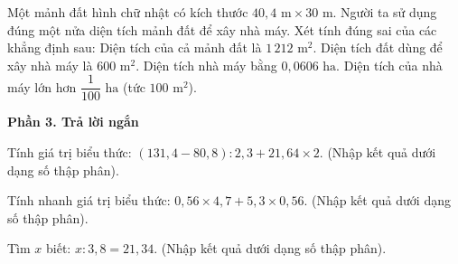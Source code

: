 \begin{ex} %
Một mảnh đất hình chữ nhật có kích thước $40{,}4\text{ m} \times 30\text{ m}$. Người ta sử dụng đúng một nửa diện tích mảnh đất để xây nhà máy. Xét tính đúng sai của các khẳng định sau:
\choiceTF
{\True Diện tích của cả mảnh đất là $1\,212\text{ m}^2$.}
{Diện tích đất dùng để xây nhà máy là $600\text{ m}^2$.}
{\True Diện tích nhà máy bằng $0{,}0606\text{ ha}$.}
{\True Diện tích của nhà máy lớn hơn $\dfrac{1}{100}\text{ ha}$ (tức $100\text{ m}^2$).}
\end{ex}

\textbf{Phần 3. Trả lời ngắn}

\begin{ex} %
Tính giá trị biểu thức: $(131{,}4 - 80{,}8) : 2{,}3 + 21{,}64 \times 2$. (Nhập kết quả dưới dạng số thập phân).
\end{ex}

\begin{ex} %
Tính nhanh giá trị biểu thức: $0{,}56 \times 4{,}7 + 5{,}3 \times 0{,}56$. (Nhập kết quả dưới dạng số thập phân).
\end{ex}

\begin{ex} %
Tìm $x$ biết: $x : 3{,}8 = 21{,}34$. (Nhập kết quả dưới dạng số thập phân).
\end{ex}

